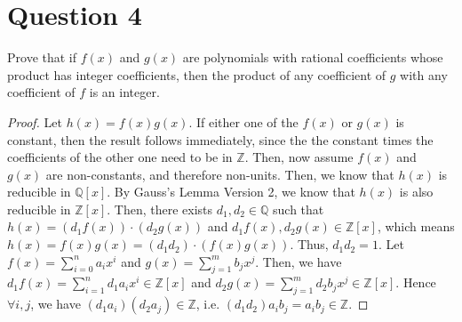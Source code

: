 \section{Question 4}

\begin{question}
    Prove that if $f(x)$ and $g(x)$ are polynomials with rational coefficients whose product has integer coefficients, then the product of any coefficient of $g$ with any coefficient of $f$ is an integer.
\end{question}

\begin{answer}
    \begin{proof}
        Let $h(x) = f(x)g(x)$. If either one of the $f(x)$ or $g(x)$ is constant, then the result follows immediately, since the the constant times the coefficients of the other one need to be in $\mathbb{Z}$. Then, now assume $f(x)$ and $g(x)$ are non-constants, and therefore non-units. Then, we know that $h(x)$ is reducible in $\mathbb{Q}[x]$. By Gauss's Lemma Version 2, we know that $h(x)$ is also reducible in $\mathbb{Z}[x]$. Then, there exists $d_1,d_2 \in \mathbb{Q}$ such that $h(x) = (d_1f(x))\cdot (d_2g(x))$ and $d_1f(x), d_2g(x) \in \mathbb{Z}[x]$, which means $h(x) = f(x)g(x) = (d_1d_2)\cdot (f(x)g(x))$. Thus, $d_1d_2 = 1$. Let $f(x) = \sum_{i=0}^{n} a_ix^i$ and $g(x) = \sum_{j=1}^{m} b_jx^j$. Then, we have $d_1f(x) = \sum_{i=1}^n d_1a_ix^i \in \mathbb{Z}[x]$ and $d_2g(x) = \sum_{j=1}^m d_2b_jx^j \in \mathbb{Z}[x]$. Hence $\forall i,j$, we have $(d_1a_i)(d_2a_j) \in \mathbb{Z}$, i.e. $(d_1d_2)a_ib_j = a_ib_j \in \mathbb{Z}$.
    \end{proof}
\end{answer}